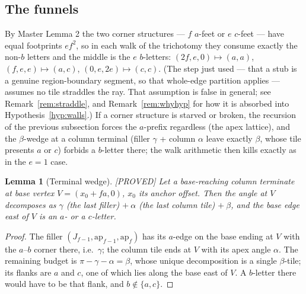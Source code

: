 \documentclass[11pt,reqno]{amsart}
\theoremstyle{plain}
\newtheorem{lemma}[theorem]{Lemma}
\theoremstyle{definition}
\newcommand{\lab}[1]{\hfill\textnormal{\footnotesize\textsc{[#1]}}}
\begin{document}
\subsection{The funnels}\label{sub:funnels}
By Master Lemma 2 the two corner structures --- $f$ $a$-feet or $e$ $c$-feet --- have equal
footprints $ef^2$, so in each walk of the trichotomy they consume exactly the non-$b$ letters and
the middle is the $e$ $b$-letters:
$(2f,e,0)\mapsto(a,a)$, $(f,e,e)\mapsto(a,c)$, $(0,e,2e)\mapsto(c,c)$.
(The step just used --- that a stub is a genuine region-boundary segment, so that whole-edge
partition applies --- assumes no tile straddles the ray. That assumption is false in general;
see Remark~\ref{rem:straddle}, and Remark~\ref{rem:whyhyp} for how it is absorbed into
Hypothesis~\ref{hyp:walls}.)
If a corner structure is starved or broken, the recursion of the previous subsection forces the
$a$-prefix regardless (the apex lattice), and the $\beta$-wedge at a column terminal (filler
$\gamma$ + column $\alpha$ leave exactly $\beta$, whose tile presents $a$ or $c$) forbids a
$b$-letter there; the walk arithmetic then kills exactly as in the $e=1$ case.

\begin{lemma}[Terminal wedge]\label{lem:termwedge}\lab{PROVED}
Let a base-reaching column terminate at base vertex $V=(x_0+fa,0)$, $x_0$ its anchor offset. Then
the angle at $V$ decomposes as $\gamma$ (the last filler) $+\ \alpha$ (the last column tile)
$+\ \beta$, and the base edge east of $V$ is an $a$- or a $c$-letter.
\end{lemma}
\begin{proof}
The filler $(J_{f-1},\mathrm{ap}_{f-1},\mathrm{ap}_f)$ has its $a$-edge on the base ending at $V$
with the $a$--$b$ corner there, i.e.\ $\gamma$; the column tile ends at $V$ with its apex angle
$\alpha$. The remaining budget is $\pi-\gamma-\alpha=\beta$, whose unique decomposition is a single
$\beta$-tile; its flanks are $a$ and $c$, one of which lies along the base east of $V$. A
$b$-letter there would have to be that flank, and $b\notin\{a,c\}$.
\end{proof}
\end{document}
